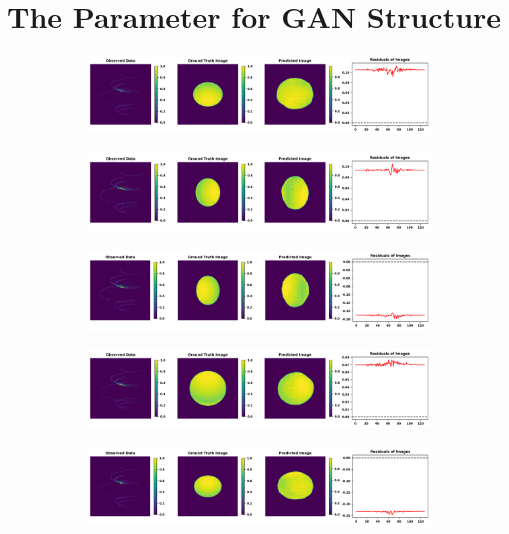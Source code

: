 \section{The Parameter for GAN Structure}

\begin{figure}
	\centering
	\begin{subfigure}{\linewidth}
		\includegraphics[width=\linewidth]{fig/testing_image/image_0.png}
	\end{subfigure}
	\begin{subfigure}{\linewidth}
		\includegraphics[width=\linewidth]{fig/testing_image/image_16.png}
	\end{subfigure}
	\begin{subfigure}{\linewidth}
		\includegraphics[width=\linewidth]{fig/testing_image/image_35.png}
	\end{subfigure}
	\begin{subfigure}{\linewidth}
		\includegraphics[width=\linewidth]{fig/testing_image/image_38.png}
	\end{subfigure}
	\begin{subfigure}{\linewidth}
		\includegraphics[width=\linewidth]{fig/testing_image/image_42.png}

\end{subfigure}
\end{figure}
